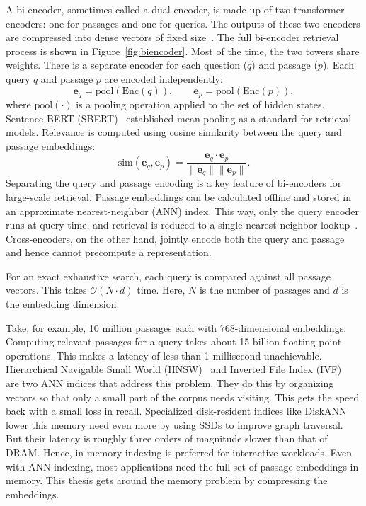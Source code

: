 A bi-encoder, sometimes called a dual encoder, is made up of two transformer encoders: one for passages and one for queries. The outputs of these two encoders are compressed into dense vectors of fixed size~\cite{reimers2019sbert, karpukhin2020dense}. The full bi-encoder retrieval process is shown in Figure~\ref{fig:biencoder}. Most of the time, the two towers share weights. There is a separate encoder for each question ($q$) and passage ($p$). Each query $q$ and passage $p$ are encoded independently:
%
\begin{equation}
  \mathbf{e}_q = \text{pool}(\text{Enc}(q)), \qquad \mathbf{e}_p = \text{pool}(\text{Enc}(p)),
\end{equation}
%
where $\text{pool}(\cdot)$ is a pooling operation applied to the set of hidden states.
Sentence-BERT (SBERT)~\cite{reimers2019sbert} established mean pooling as a standard for retrieval models. Relevance is computed using cosine similarity between the query and passage embeddings:
%
\begin{equation}
  \text{sim}(\mathbf{e}_q, \mathbf{e}_p) = \frac{\mathbf{e}_q \cdot \mathbf{e}_p}{\|\mathbf{e}_q\| \|\mathbf{e}_p\|}.
\end{equation}
%
Separating the query and passage encoding is a key feature of bi-encoders for large-scale retrieval. Passage embeddings can be calculated offline and stored in an approximate nearest-neighbor (ANN) index. This way, only the query encoder runs at query time, and retrieval is reduced to a single nearest-neighbor lookup~\cite{karpukhin2020dense}. Cross-encoders, on the other hand, jointly encode both the query and passage and hence cannot precompute a representation.

For an exact exhaustive search, each query is compared against all passage vectors. This takes $\mathcal{O}(N \cdot d)$ time. Here, $N$ is the number of passages and $d$ is the embedding dimension.

Take, for example, 10 million passages each with 768-dimensional embeddings. Computing relevant passages for a query takes about 15 billion floating-point operations. This makes a latency of less than 1 millisecond unachievable. Hierarchical Navigable Small World (HNSW)~\cite{malkov2018efficient} and Inverted File Index (IVF)~\cite{johnson2021billion} are two ANN indices that address this problem. They do this by organizing vectors so that only a small part of the corpus needs visiting. This gets the speed back with a small loss in recall. Specialized disk-resident indices like DiskANN~\cite{subramanya2019diskann} lower this memory need even more by using SSDs to improve graph traversal. But their latency is roughly three orders of magnitude slower than that of DRAM. Hence, in-memory indexing is preferred for interactive workloads. Even with ANN indexing, most applications need the full set of passage embeddings in memory. This thesis gets around the memory problem by compressing the embeddings.

